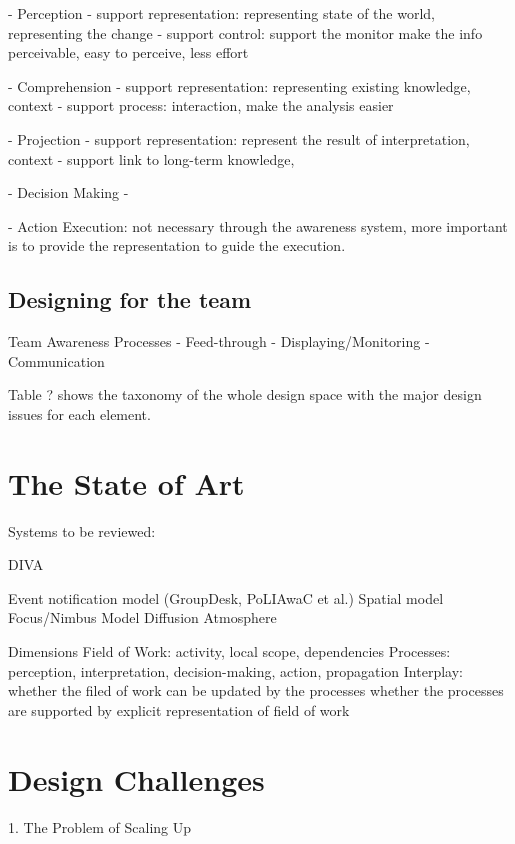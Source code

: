  - Perception
  - support representation: representing state of the world, representing the change
  - support control: support the monitor
  make the info perceivable, easy to perceive, less effort

 - Comprehension
  - support representation: representing existing knowledge, context
  - support process: interaction, make the analysis easier 	

 - Projection
  - support representation: represent the result of interpretation, context
  - support link to long-term knowledge, 

 - Decision Making
  - 

 - Action Execution: not necessary through the awareness system, more important is to provide the representation to guide the execution.

\subsection{Designing for the team} %
\label{sub:designing_for_the_team}
Team Awareness Processes
 - Feed-through
 - Displaying/Monitoring
 - Communication

Table ? shows the taxonomy of the whole design space with the major design issues for each element.


\section{The State of Art} %
\label{sec:the_state_of_art}

Systems to be reviewed:

DIVA \cite{springerlink:10.1023/A:1008608425504}

Event notification model (GroupDesk, PoLIAwaC et al.)
Spatial model
Focus/Nimbus Model
Diffusion
Atmosphere

Dimensions
Field of Work: activity, local scope, dependencies
Processes: perception, interpretation, decision-making, action, propagation
Interplay: 
whether the filed of work can be updated by the processes
whether the processes are supported by explicit representation of field of work


\section{Design Challenges} %
\label{sec:design_challenges}
1. The Problem of Scaling Up

